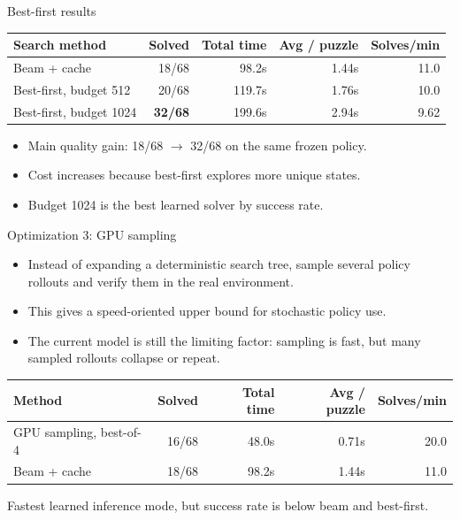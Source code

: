 \documentclass[aspectratio=169]{beamer}
\begin{document}
\begin{frame}{Best-first results}
  \small
  \centering
  \begin{tabular}{@{}lrrrr@{}}
    \toprule
    Search method & Solved & Total time & Avg / puzzle & Solves/min \\
    \midrule
    Beam + cache & 18/68 & 98.2s & 1.44s & 11.0 \\
    Best-first, budget 512 & 20/68 & 119.7s & 1.76s & 10.0 \\
    Best-first, budget 1024 & \textbf{32/68} & 199.6s & 2.94s & 9.62 \\
    \bottomrule
  \end{tabular}

  \vspace{0.7em}
  \begin{itemize}
    \item Main quality gain: 18/68 \(\rightarrow\) 32/68 on the same frozen policy.
    \item Cost increases because best-first explores more unique states.
    \item Budget 1024 is the best learned solver by success rate.
  \end{itemize}
\end{frame}

\begin{frame}{Optimization 3: GPU sampling}
  \small
  \begin{itemize}
    \item Instead of expanding a deterministic search tree, sample several policy rollouts and verify them in the real environment.
    \item This gives a speed-oriented upper bound for stochastic policy use.
    \item The current model is still the limiting factor: sampling is fast, but many sampled rollouts collapse or repeat.
  \end{itemize}

  \vspace{0.6em}
  \centering
  \begin{tabular}{@{}lrrrr@{}}
    \toprule
    Method & Solved & Total time & Avg / puzzle & Solves/min \\
    \midrule
    GPU sampling, best-of-4 & 16/68 & 48.0s & 0.71s & 20.0 \\
    Beam + cache & 18/68 & 98.2s & 1.44s & 11.0 \\
    \bottomrule
  \end{tabular}

  \vspace{0.5em}
  \scriptsize
  Fastest learned inference mode, but success rate is below beam and best-first.
\end{frame}
\end{document}
